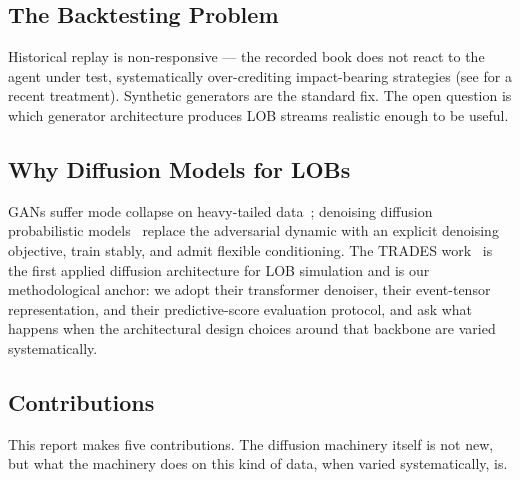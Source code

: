 \documentclass[journal]{IEEEtran}
\theoremstyle{definition}   %
\begin{document}
\subsection{The Backtesting Problem}
\label{sec:backtest_problem}

Historical replay is non-responsive --- the recorded book does not
react to the agent under test, systematically over-crediting
impact-bearing strategies (see \cite{berti2025trades} for a recent
treatment). Synthetic generators are the standard fix. The open
question is which generator architecture produces LOB streams
realistic enough to be useful.

\subsection{Why Diffusion Models for LOBs}
\label{sec:why_diffusion}

GANs suffer mode collapse on heavy-tailed
data~\cite{li2020generating, coletta2021towards, coletta2022learning};
denoising diffusion probabilistic models~\cite{ho2020denoising}
replace the adversarial dynamic with an explicit denoising
objective, train stably, and admit flexible conditioning. The
TRADES work~\cite{berti2025trades} is the first applied diffusion
architecture for LOB simulation and is our methodological anchor:
we adopt their transformer denoiser, their event-tensor
representation, and their predictive-score evaluation protocol,
and ask what happens when the architectural design choices around
that backbone are varied systematically.

\subsection{Contributions}
\label{sec:contributions}

This report makes five contributions. The diffusion machinery itself
is not new, but what the machinery does on this kind of data, when
varied systematically, is.
\end{document}
